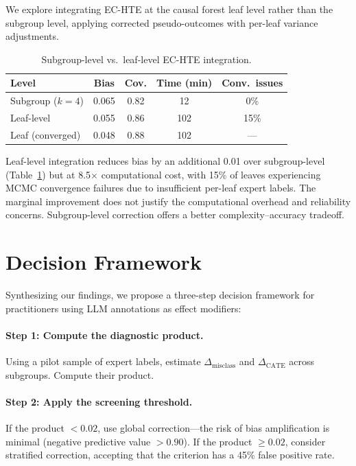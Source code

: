 \documentclass[11pt,a4paper]{article}
\begin{document}
We explore integrating EC-HTE at the causal forest leaf level rather than the subgroup level, applying corrected pseudo-outcomes with per-leaf variance adjustments.

\begin{table}[t]
\centering
\small
\caption{Subgroup-level vs.\ leaf-level EC-HTE integration.}
\label{tab:leaf}
\begin{tabular}{@{}lcccc@{}}
\toprule
Level & Bias & Cov. & Time (min) & Conv.\ issues \\
\midrule
Subgroup ($k{=}4$) & 0.065 & 0.82 & 12 & 0\% \\
Leaf-level & 0.055 & 0.86 & 102 & 15\% \\
Leaf (converged) & 0.048 & 0.88 & 102 & --- \\
\bottomrule
\end{tabular}
\end{table}

Leaf-level integration reduces bias by an additional 0.01 over subgroup-level (Table~\ref{tab:leaf}) but at 8.5$\times$ computational cost, with 15\% of leaves experiencing MCMC convergence failures due to insufficient per-leaf expert labels. The marginal improvement does not justify the computational overhead and reliability concerns. Subgroup-level correction offers a better complexity--accuracy tradeoff.

\section{Decision Framework}
\label{sec:framework}

Synthesizing our findings, we propose a three-step decision framework for practitioners using LLM annotations as effect modifiers:

\paragraph{Step 1: Compute the diagnostic product.} Using a pilot sample of expert labels, estimate $\Delta_{\text{misclass}}$ and $\Delta_{\text{CATE}}$ across subgroups. Compute their product.

\paragraph{Step 2: Apply the screening threshold.} If the product $< 0.02$, use global correction---the risk of bias amplification is minimal (negative predictive value $> 0.90$). If the product $\geq 0.02$, consider stratified correction, accepting that the criterion has a 45\% false positive rate.
\end{document}
